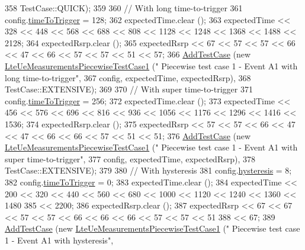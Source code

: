 \begin{DoxyCode}
358                TestCase::QUICK);
359 
360   \textcolor{comment}{// With long time-to-trigger}
361   config.\hyperlink{structns3_1_1LteRrcSap_1_1ReportConfigEutra_aee64b76b166b1beda5bbe1760363ed24}{timeToTrigger} = 128;
362   expectedTime.clear ();
363   expectedTime << 328 << 448 << 568 << 688 << 808 << 1128 << 1248 << 1368 << 1488 << 2128;
364   expectedRsrp.clear ();
365   expectedRsrp << 67 << 57 << 57 << 66 << 47 << 66 << 57 << 57 << 51 << 57;
366   \hyperlink{classns3_1_1TestCase_a3718088e3eefd5d6454569d2e0ddd835}{AddTestCase} (\textcolor{keyword}{new} \hyperlink{classLteUeMeasurementsPiecewiseTestCase1}{LteUeMeasurementsPiecewiseTestCase1} (\textcolor{stringliteral}{"
      Piecewise test case 1 - Event A1 with long time-to-trigger"},
367                                                         config, expectedTime, expectedRsrp),
368                TestCase::EXTENSIVE);
369 
370   \textcolor{comment}{// With super time-to-trigger}
371   config.\hyperlink{structns3_1_1LteRrcSap_1_1ReportConfigEutra_aee64b76b166b1beda5bbe1760363ed24}{timeToTrigger} = 256;
372   expectedTime.clear ();
373   expectedTime << 456 << 576 << 696 << 816 << 936 << 1056 << 1176 << 1296 << 1416 << 1536;
374   expectedRsrp.clear ();
375   expectedRsrp << 57 << 57 << 66 << 47 << 47 << 66 << 66 << 57 << 51 << 51;
376   \hyperlink{classns3_1_1TestCase_a3718088e3eefd5d6454569d2e0ddd835}{AddTestCase} (\textcolor{keyword}{new} \hyperlink{classLteUeMeasurementsPiecewiseTestCase1}{LteUeMeasurementsPiecewiseTestCase1} (\textcolor{stringliteral}{"
      Piecewise test case 1 - Event A1 with super time-to-trigger"},
377                                                         config, expectedTime, expectedRsrp),
378                TestCase::EXTENSIVE);
379 
380   \textcolor{comment}{// With hysteresis}
381   config.\hyperlink{structns3_1_1LteRrcSap_1_1ReportConfigEutra_a1fb9169ea261ba20af6a0c18fcc04fa9}{hysteresis} = 8;
382   config.\hyperlink{structns3_1_1LteRrcSap_1_1ReportConfigEutra_aee64b76b166b1beda5bbe1760363ed24}{timeToTrigger} = 0;
383   expectedTime.clear ();
384   expectedTime << 200 << 320 << 440 << 560 << 680 << 1000 << 1120 << 1240 << 1360 << 1480
385                << 2200;
386   expectedRsrp.clear ();
387   expectedRsrp << 67 << 67 << 57 << 57 << 66 << 66 << 66 << 57 << 57 << 51
388                << 67;
389   \hyperlink{classns3_1_1TestCase_a3718088e3eefd5d6454569d2e0ddd835}{AddTestCase} (\textcolor{keyword}{new} \hyperlink{classLteUeMeasurementsPiecewiseTestCase1}{LteUeMeasurementsPiecewiseTestCase1} (\textcolor{stringliteral}{"
      Piecewise test case 1 - Event A1 with hysteresis"},

\end{DoxyCode}
